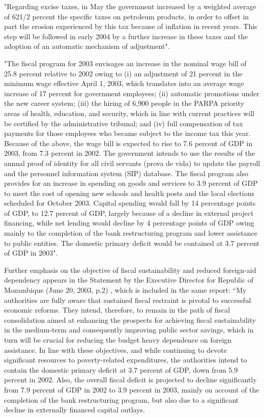 "Regarding excise taxes, in May the government increased by a weighted average of 621/2 percent the specific taxes on petroleum products, in order to offset in part the erosion experienced by this tax because of inflation in recent years. This step will be followed in early 2004 by a further increase in these taxes and the adoption of an automatic mechanism of adjustment".

"The fiscal program for 2003 envisages an increase in the nominal wage bill of 25.8 percent relative to 2002 owing to (i) an adjustment of 21 percent in the minimum wage effective April 1, 2003, which translates into an average wage increase of 17 percent for government employees; (ii) automatic promotions under the new career system; (iii) the hiring of 6,900 people in the PARPA priority areas of health, education, and security, which in line with current practices will be certified by the administrative tribunal; and (iv) full compensation of tax payments for those employees who became subject to the income tax this year. Because of the above, the wage bill is expected to rise to 7.6 percent of GDP in 2003, from 7.3 percent in 2002. The government intends to use the results of the annual proof of identity for all civil servants (prova de vida) to update the payroll and the personnel information system (SIP) database. The fiscal program also provides for an increase in spending on goods and services to 3.9 percent of GDP to meet the cost of opening new schools and health posts and the local elections scheduled for October 2003. Capital spending would fall by 14 percentage points of GDP, to 12.7 percent of GDP, largely because of a decline in external project financing, while net lending would decline by 4 percentage points of GDP owing mainly to the completion of the bank restructuring program and lower assistance to public entities. The domestic primary deficit would be contained at 3.7 percent of GDP in 2003".

Further emphasis on the objective of fiscal sustainability and reduced foreign-aid dependency appears in the Statement by the Executive Director for Republic of Mozambique (June 20, 2003, p.2) , which is included in the same report: “My authorities are fully aware that sustained fiscal restraint is pivotal to successful economic reforms. They intend, therefore, to remain in the path of fiscal consolidation aimed at enhancing the prospects for achieving fiscal sustainability in the medium-term and consequently improving public sector savings, which in turn will be crucial for reducing the budget heavy dependence on foreign assistance. In line with these objectives, and while continuing to devote significant resources to poverty-related expenditures, the authorities intend to contain the domestic primary deficit at 3.7 percent of GDP, down from 5.9 percent in 2002. Also, the overall fiscal deficit is projected to decline significantly from 7.9 percent of GDP in 2002 to 3.9 percent in 2003, mainly on account of the completion of the bank restructuring program, but also due to a significant decline in externally financed capital outlays.

